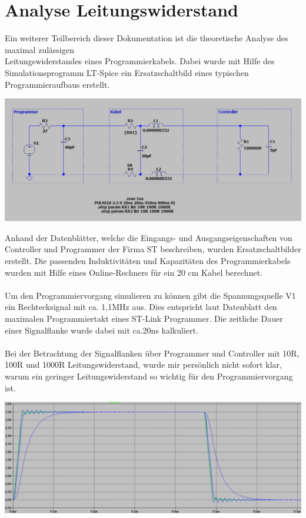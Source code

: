 \section{Analyse Leitungswiderstand}

Ein weiterer Teilbereich dieser Dokumentation ist die theoretische Analyse des maximal zulässigen\\ Leitungswiderstandes eines Programmierkabels. Dabei wurde mit Hilfe des Simulationsprogramm \glqq LT-Spice\grqq{} ein Ersatzschaltbild eines typischen Programmieraufbaus erstellt.\\

\begin{center}
\includegraphics[width=17cm]{Bilder/LTC-SCHALTBILD.png}
\end{center}

Anhand der Datenblätter, welche die Eingangs- und Ausgangseigenschaften von Controller und Programmer der Firma ST beschreiben, wurden Ersatzschaltbilder erstellt. Die passenden Induktivitäten und Kapazitäten des Programmierkabels wurden mit Hilfe eines Online-Rechners für ein 20 cm Kabel berechnet.
\\
\\
Um den Programmiervorgang simulieren zu können gibt die Spannungsquelle V1 ein Rechtecksignal mit ca. 1,1MHz aus. Dies entspricht laut Datenblatt den maximalen Programmiertakt eines ST-Link Programmer. Die zeitliche Dauer einer Signalflanke wurde dabei mit ca.20ns kalkuliert.
\\
\\
Bei der Betrachtung der Signalflanken über Programmer und Controller mit 10R, 100R und 1000R Leitungswiderstand, wurde mir persönlich nicht sofort klar, warum ein geringer Leitungswiderstand so wichtig für den Programmiervorgang ist. 

\begin{center}
\includegraphics[width=17cm]{Bilder/LTC-SIGNALVERLAUF1.png}
\end{center}

